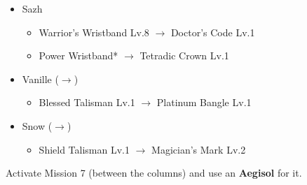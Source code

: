 \begin{menu}
\begin{itemize}
\begin{itemize}
			\item Sazh
				\begin{itemize}
					\item Warrior's Wristband Lv.8 $\rightarrow$ Doctor's Code Lv.1
					\item Power Wristband* $\rightarrow$ Tetradic Crown Lv.1
				\end{itemize}
			\item Vanille ($\rightarrow$)
			    \begin{itemize}
					\item Blessed Talisman Lv.1 $\rightarrow$ Platinum Bangle Lv.1
			    \end{itemize}
			\item Snow ($\rightarrow$)
			    \begin{itemize}
				    \item Shield Talisman Lv.1 $\rightarrow$ Magician's Mark Lv.2
			    \end{itemize}
		\end{itemize}
	\end{itemize}
\end{menu}

\renewcommand{\first}{[1] Mystic Tower (\rav/\rav/\sen)}
\renewcommand{\second}{[2] Tri-Disaster (\rav/\rav/\rav)}
\renewcommand{\third}{[3] Smart Bomb (\rav/\sab/\rav)}
\renewcommand{\fourth}{[4] Hero's Charge (\syn/\med/\com)}
\renewcommand{\fifth}{[5] Aggression (\com/\rav/\com)}
\renewcommand{\sixth}{[6] Dirty Fighting (\com/\sab/\sen)}

Activate Mission 7 (between the columns) and use an \textbf{Aegisol} for it.

